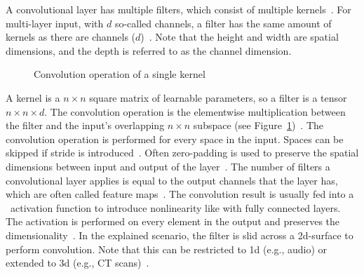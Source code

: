 A convolutional layer has multiple filters, which consist of multiple
kernels~\citep{chauhan_review_2018}.
For multi-layer input, with $d$ so-called channels, a filter has the same amount of kernels as there
are channels ($d$)~\citep{ponti_everything_2017}.
Note that the height and width are spatial dimensions, and the depth is referred to
as the channel dimension.
\begin{figure}[ht]
    \centering
    
    \caption[Visualization of a convolution operation]{%
        Convolution operation of a single kernel~\citep{chauhan_review_2018}\label{fig:conv-layer}
    }
\end{figure}
A kernel is a $n\times n$ square matrix of learnable parameters, so a filter is a tensor
$n\times n\times d$.
The convolution operation is the elementwise multiplication between the filter and the input's
overlapping $n\times n$ subspace (see Figure~\ref{fig:conv-layer})~\citep{ponti_everything_2017}.
The convolution operation is performed for every space in the input.
Spaces can be skipped if stride is introduced~\citep{ponti_everything_2017}.
Often zero-padding is used to preserve the spatial dimensions between input and output of
the layer~\citep{ponti_everything_2017,simonyan_very_2015}.
The number of filters a convolutional layer applies is equal to the output channels that the layer
has, which are often called feature maps~\citep{ponti_everything_2017}.
The convolution result is usually fed into a \relu\ activation function to introduce
nonlinearity like with fully connected layers.
The activation is performed on every element in the output and preserves the
dimensionality~\citep{ponti_everything_2017}.
In the explained scenario, the filter is slid across a 2d-surface to perform convolution.
Note that this can be restricted to 1d (e.g., audio) or extended to 3d (e.g., CT
scans)~\citep{goodfellow_deep_2016}.

